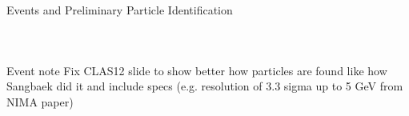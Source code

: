 \documentclass[aspectratio=169]{beamer}
\newcommand*{\myfont}{\fontfamily{lmtt}\selectfont}
\begin{document}
\begin{frame}{Events and Preliminary Particle Identification}
\begin{columns}[t, onlytextwidth]
\begin{columns}[t, onlytextwidth]
\begin{figure}[t!]
                    
                    
                             \end{figure}
               
              
        \end{columns}
          \centering
        {\myfont{\tiny [S. Lee] }}

        \end{columns}
\end{frame}    

\begin{frame}{Event note}
Fix CLAS12 slide to show better how particles are found like how Sangbaek did it and include specs (e.g. resolution of 3.3 sigma up to 5 GeV from NIMA paper)
\end{frame}
\end{document}
